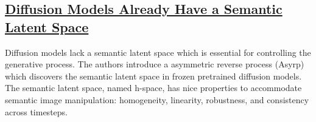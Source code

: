 \documentclass[12pt]{amsart}
\begin{document}
\subsection{\href{https://openreview.net/pdf?id=pd1P2eUBVfq}{Diffusion Models Already Have a Semantic Latent Space}}

\begin{approach*}
Diffusion models lack a semantic latent space which is essential for controlling the generative process. The authors introduce a asymmetric reverse process (Asyrp) which discovers the semantic latent space in frozen pretrained diffusion models. The semantic latent space, named h-space, has nice properties to accommodate semantic image manipulation: homogeneity, linearity, robustness, and consistency across timesteps.
\end{approach*}
\end{document}
